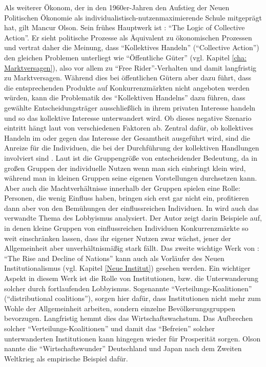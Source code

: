 Als weiterer Ökonom, der in den 1960er-Jahren den Aufstieg der Neuen Politischen Ökonomie als individualistisch-nutzenmaximierende Schule mitgeprägt hat, gilt Mancur Olson. Sein frühes Hauptwerk ist \textcite{Olson1965}: "`The Logic of Collective Action"'. Er sieht politische Prozesse als Äquivalent zu ökonomischen Prozessen und vertrat daher die Meinung, dass "`Kollektives Handeln"' ("`Collective Action"') den gleichen Problemen unterliegt wie "`Öffentliche Güter"' (vgl. Kapitel \ref{cha: Marktversagen}), also vor allem zu "`Free Rider"'-Verhalten und damit langfristig zu Marktversagen. Während dies bei öffentlichen Gütern aber dazu führt, dass die entsprechenden Produkte auf Konkurrenzmärkten nicht angeboten werden würden, kann die Problematik des "`Kollektiven Handelns"' dazu führen, dass gewählte Entscheidungsträger ausschließlich in ihrem privaten Interesse handeln und so das kollektive Interesse unterwandert wird. Ob dieses negative Szenario eintritt hängt laut \textcite{Olson1965} von verschiedenen Faktoren ab. Zentral dafür, ob kollektives Handeln im oder gegen das Interesse der Gesamtheit ausgeführt wird, sind die Anreize für die Individuen, die bei der Durchführung der kollektiven Handlungen involviert sind \parencite[S. 446]{Dixit1999}. Laut \textcite{Olson1965} ist die Gruppengröße von entscheidender Bedeutung, da in großen Gruppen der individuelle Nutzen wenn man sich einbringt klein wird, während man in kleinen Gruppen seine eigenen Vorstellungen durchsetzen kann. Aber auch die Machtverhältnisse innerhalb der Gruppen spielen eine Rolle: Personen, die wenig Einfluss haben, bringen sich erst gar nicht ein, profitieren dann aber von den Bemühungen der einflussreichen Individuen. In \textcite{Olson1965} wird auch das verwandte Thema des Lobbyismus analysiert. Der Autor zeigt darin Beispiele auf, in denen kleine Gruppen von einflussreichen Individuen Konkurrenzmärkte so weit einschränken lassen, dass ihr eigener Nutzen zwar wächst, jener der Allgemeinheit aber unverhältnismäßig stark fällt. 
Das zweite wichtige Werk von \textcite{Olson1982}: "`The Rise and Decline of Nations"' kann auch als Vorläufer des Neuen Institutionalismus (vgl. Kapitel \ref{Neue Institut}) gesehen werden. Ein wichtiger Aspekt in diesem Werk ist die Rolle von Institutionen, bzw. die Unterwanderung solcher durch fortlaufenden Lobbyismus. Sogenannte "`Verteilungs-Koalitionen"' ("`distributional coalitions"'), sorgen hier dafür, dass Institutionen nicht mehr zum Wohle der Allgemeinheit arbeiten, sondern einzelne Bevölkerungsgruppen bevorzugen. Langfristig hemmt dies das Wirtschaftswachstum. Das Aufbrechen solcher "`Verteilungs-Koalitionen"' und damit das "`Befreien"' solcher unterwanderten Institutionen kann hingegen wieder für Prosperität sorgen. Olson nannte die "`Wirtschaftswunder"' Deutschland und Japan nach dem Zweiten Weltkrieg als empirische Beispiel dafür.

